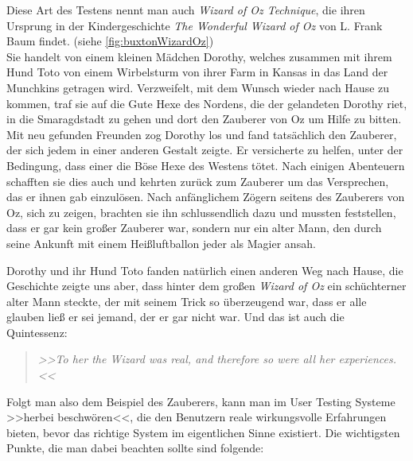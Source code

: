 \medskip Diese Art des Testens nennt man auch \emph{Wizard of Oz Technique}, die ihren Ursprung in der Kindergeschichte \emph{The Wonderful Wizard of Oz} von L. Frank Baum findet. (siehe \autoref{fig:buxtonWizardOz}) \\ Sie handelt von einem kleinen Mädchen Dorothy, welches zusammen mit ihrem Hund Toto von einem Wirbelsturm von ihrer Farm in Kansas in das Land der Munchkins getragen wird. Verzweifelt, mit dem Wunsch wieder nach Hause zu kommen, traf sie auf die Gute Hexe des Nordens, die der gelandeten Dorothy riet, in die Smaragdstadt zu gehen und dort den Zauberer von Oz um Hilfe zu bitten. Mit neu gefunden Freunden zog Dorothy los und fand tatsächlich den Zauberer, der sich jedem in einer anderen Gestalt zeigte. Er versicherte zu helfen, unter der Bedingung, dass einer die Böse Hexe des Westens tötet. Nach einigen Abenteuern schafften sie dies auch und kehrten zurück zum Zauberer um das Versprechen, das er ihnen gab einzulösen. Nach anfänglichem Zögern seitens des Zauberers von Oz, sich zu zeigen, brachten sie ihn schlussendlich dazu und mussten feststellen, dass er gar kein großer Zauberer war, sondern nur ein alter Mann, den durch seine Ankunft mit einem Heißluftballon jeder als Magier ansah. \citep{Baum:2008}

\medskip Dorothy und ihr Hund Toto fanden natürlich einen anderen Weg nach Hause, die Geschichte zeigte uns aber, dass hinter dem großen \emph{Wizard of Oz} ein schüchterner alter Mann steckte, der mit seinem Trick so überzeugend war, dass er alle glauben ließ er sei jemand, der er gar nicht war. Und das ist auch die Quintessenz: 

\begin{quote}
	\textsl{>>To her the Wizard was real, and therefore so were all her experiences.<<}
\begin{flushright}\citep{Buxton:2007}\end{flushright}
\end{quote}

Folgt man also dem Beispiel des Zauberers, kann man im User Testing Systeme >>herbei beschwören<<, die den Benutzern reale wirkungsvolle Erfahrungen bieten, bevor das richtige System im eigentlichen Sinne existiert. Die wichtigsten Punkte, die man dabei beachten sollte sind folgende:

